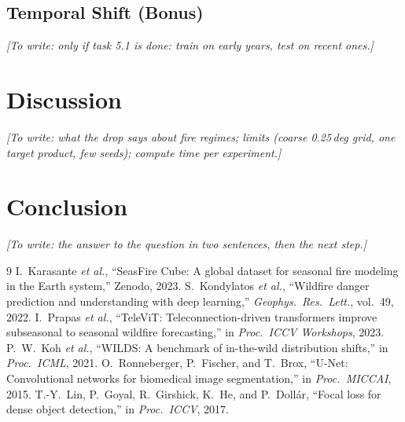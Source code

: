 \documentclass[10pt,a4paper]{article}
\newcommand\guide[1]{\textit{[To write: #1]}\par}                       %
\newcommand\dummy[1]{\lipsum[#1]\par}                                   %
\begin{document}
\subsection{Temporal Shift (Bonus)}
\guide{only if task 5.1 is done: train on early years, test on recent ones.}
\dummy{25}

\section{Discussion}
\guide{what the drop says about fire regimes; limits (coarse 0.25\,deg grid, one target product, few seeds); compute time per experiment.}
\dummy{26-28}
\dummy{48-51}
\dummy{53-55}

\section{Conclusion}
\guide{the answer to the question in two sentences, then the next step.}
\dummy{29}
\dummy{52}

\begin{thebibliography}{9}
 I.~Karasante \emph{et al.}, ``SeasFire Cube: A global dataset for seasonal fire modeling in the Earth system,'' Zenodo, 2023.
 S.~Kondylatos \emph{et al.}, ``Wildfire danger prediction and understanding with deep learning,'' \emph{Geophys.\ Res.\ Lett.}, vol.~49, 2022.
 I.~Prapas \emph{et al.}, ``TeleViT: Teleconnection-driven transformers improve subseasonal to seasonal wildfire forecasting,'' in \emph{Proc.\ ICCV Workshops}, 2023.
 P.~W.~Koh \emph{et al.}, ``WILDS: A benchmark of in-the-wild distribution shifts,'' in \emph{Proc.\ ICML}, 2021.
 O.~Ronneberger, P.~Fischer, and T.~Brox, ``U-Net: Convolutional networks for biomedical image segmentation,'' in \emph{Proc.\ MICCAI}, 2015.
 T.-Y.~Lin, P.~Goyal, R.~Girshick, K.~He, and P.~Doll\'ar, ``Focal loss for dense object detection,'' in \emph{Proc.\ ICCV}, 2017.
\end{thebibliography}
\end{document}

